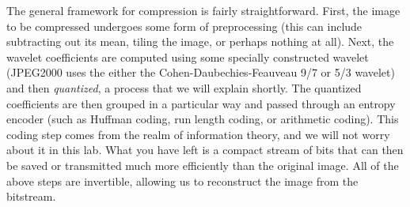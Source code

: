 The general framework for compression is fairly straightforward. First,
the image to be compressed undergoes some form of preprocessing (this
can include subtracting out its mean, tiling the image, or perhaps
nothing at all). Next, the wavelet coefficients are computed using some
specially constructed wavelet (JPEG2000 uses the either the
Cohen-Daubechies-Feauveau 9/7 or 5/3 wavelet) and then \textit{quantized},
 a process that we will explain shortly. The quantized coefficients are
 then grouped in a particular way and passed through an entropy encoder
 (such as Huffman coding, run length coding, or arithmetic coding). This
 coding step comes from the realm of information theory, and we will not
 worry about it in this lab. What you have left is a compact stream of bits
 that can then be saved or transmitted much more efficiently than the
 original image. All of the above steps are invertible, allowing us to
 reconstruct the image from the bitstream.

